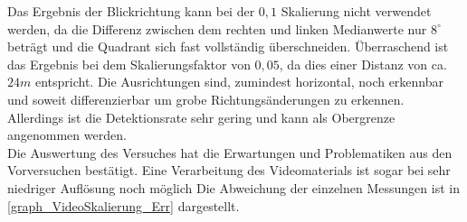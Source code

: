 Das Ergebnis der Blickrichtung kann bei der $0,1$ Skalierung nicht verwendet werden, da die Differenz zwischen dem rechten und linken Medianwerte nur $8^\circ$ beträgt und die Quadrant sich fast vollständig überschneiden.
Überraschend ist das Ergebnis bei dem Skalierungsfaktor von $0,05$, da dies einer Distanz von ca. $24m$ entspricht. Die Ausrichtungen sind, zumindest horizontal, noch erkennbar und soweit differenzierbar um grobe Richtungsänderungen zu erkennen. Allerdings ist die Detektionsrate sehr gering und kann als Obergrenze angenommen werden.\\
Die Auswertung des Versuches hat die Erwartungen und Problematiken aus den Vorversuchen bestätigt. Eine Verarbeitung des Videomaterials ist sogar bei sehr niedriger Auflösung noch möglich Die Abweichung der einzelnen Messungen ist in \autoref{graph_VideoSkalierung_Err} dargestellt.
